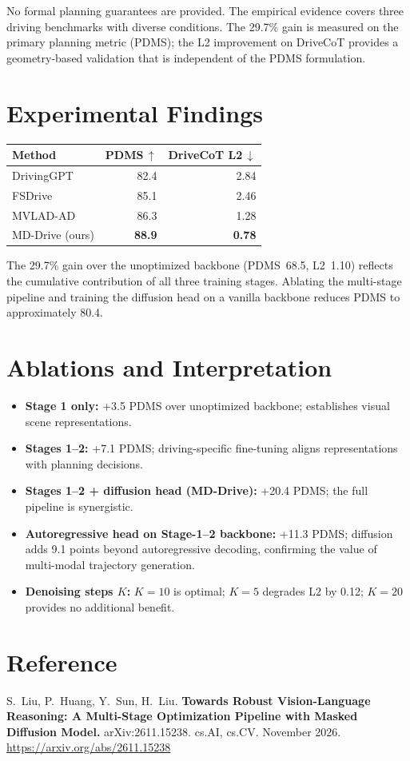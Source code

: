\documentclass[10pt,twocolumn]{article}
\begin{document}
No formal planning guarantees are provided.
The empirical evidence covers three driving benchmarks with diverse conditions.
The 29.7\% gain is measured on the primary planning metric (PDMS); the L2 improvement on DriveCoT provides a geometry-based validation that is independent of the PDMS formulation.

\section{Experimental Findings}

\begin{center}
\small
\begin{tabular}{lrr}
\toprule
\textbf{Method} & \textbf{PDMS\,$\uparrow$} & \textbf{DriveCoT L2\,$\downarrow$} \\
\midrule
DrivingGPT        & 82.4 & 2.84 \\
FSDrive           & 85.1 & 2.46 \\
MVLAD-AD          & 86.3 & 1.28 \\
MD-Drive (ours)   & \textbf{88.9} & \textbf{0.78} \\
\bottomrule
\end{tabular}
\end{center}

The 29.7\% gain over the unoptimized backbone (PDMS~68.5, L2~1.10) reflects the cumulative contribution of all three training stages.
Ablating the multi-stage pipeline and training the diffusion head on a vanilla backbone reduces PDMS to approximately 80.4.

\section{Ablations and Interpretation}

\begin{itemize}[leftmargin=1em,itemsep=2pt]
  \item \textbf{Stage 1 only:} +3.5 PDMS over unoptimized backbone; establishes visual scene representations.
  \item \textbf{Stages 1--2:} +7.1 PDMS; driving-specific fine-tuning aligns representations with planning decisions.
  \item \textbf{Stages 1--2 + diffusion head (MD-Drive):} +20.4 PDMS; the full pipeline is synergistic.
  \item \textbf{Autoregressive head on Stage-1--2 backbone:} +11.3 PDMS; diffusion adds 9.1 points beyond autoregressive decoding, confirming the value of multi-modal trajectory generation.
  \item \textbf{Denoising steps $K$:} $K=10$ is optimal; $K=5$ degrades L2 by 0.12; $K=20$ provides no additional benefit.
\end{itemize}

\section*{Reference}
S.\ Liu, P.\ Huang, Y.\ Sun, H.\ Liu.
\textbf{Towards Robust Vision-Language Reasoning: A Multi-Stage Optimization Pipeline with Masked Diffusion Model.}
arXiv:2611.15238. cs.AI, cs.CV. November 2026.
\url{https://arxiv.org/abs/2611.15238}
\end{document}
